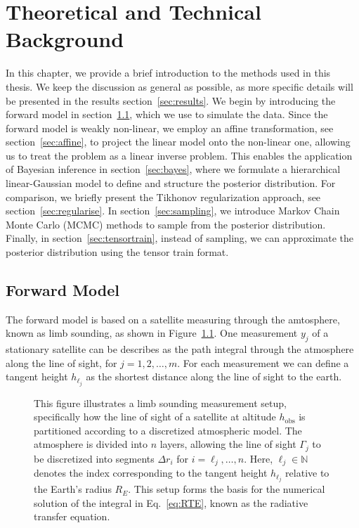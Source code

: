 \chapter{Theoretical and Technical Background}
\label{ch:background}
In this chapter, we provide a brief introduction to the methods used in this thesis. We keep the discussion as general as possible, as more specific details will be presented in the results section~\ref{sec:results}.
We begin by introducing the forward model in section~\ref{sec:formodel}, which we use to simulate the data. Since the forward model is weakly non-linear, we employ an affine transformation, see section~\ref{sec:affine}, to project the linear model onto the non-linear one, allowing us to treat the problem as a linear inverse problem.
This enables the application of Bayesian inference in section~\ref{sec:bayes}, where we formulate a hierarchical linear-Gaussian model to define and structure the posterior distribution.
For comparison, we briefly present the Tikhonov regularization approach, see section~\ref{sec:regularise}.
In section~\ref{sec:sampling}, we introduce Markov Chain Monte Carlo (MCMC) methods to sample from the posterior distribution.
Finally, in section~\ref{sec:tensortrain}, instead of sampling, we can approximate the posterior distribution using the tensor train format.


\section{Forward Model}
\label{sec:formodel}
The forward model is based on a satellite measuring through the amtosphere, known as limb sounding, as shown in Figure~\ref{fig:FirstLIMB}.
One measurement $y_j$ of a stationary satellite can be describes as the path integral through the atmosphere along the line of sight, for $j=1,2,\ldots,m$.
For each measurement we can define a tangent height $h_{\ell_j}$ as the shortest distance along the line of sight to the earth.

\begin{figure}[ht!]
	\centering
	\scalebox{0.9}{}
	\caption{This figure illustrates a limb sounding measurement setup, specifically how the line of sight of a satellite at altitude $h_{\text{obs}}$ is partitioned according to a discretized atmospheric model. The atmosphere is divided into $n$ layers, allowing the line of sight $\Gamma_j$ to be discretized into segments $\Delta r_i$ for $i = \ell_j, \dots, n$.
	Here, $\ell_j \in \mathbb{N}$ denotes the index corresponding to the tangent height $h_{\ell_j}$ relative to the Earth's radius $R_E$. This setup forms the basis for the numerical solution of the integral in Eq.~\ref{eq:RTE}, known as the radiative transfer equation.}
	\label{fig:FirstLIMB}
\end{figure}

